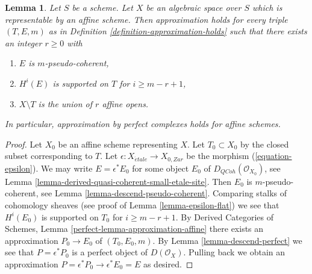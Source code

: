 \documentclass[10pt,a4paper]{amsart}
\theoremstyle{plain}
\newtheorem{lemma}[subsection]{Lemma}
\theoremstyle{definition}
\theoremstyle{remark}
\numberwithin{equation}{subsection}
\def\etale{{\acute{e}tale}}
\def\QCoh{\mathit{QCoh}}
\begin{document}
\begin{lemma}
\label{lemma-approximation-affine}
Let $S$ be a scheme. Let $X$ be an algebraic space over $S$ which is
representable by an affine scheme. Then approximation holds for every
triple $(T, E, m)$ as in Definition \ref{definition-approximation-holds}
such that there exists an integer $r \geq 0$ with
\begin{enumerate}
\item $E$ is $m$-pseudo-coherent,
\item $H^i(E)$ is supported on $T$ for $i \geq m - r + 1$,
\item $X \setminus T$ is the union of $r$ affine opens.
\end{enumerate}
In particular, approximation by perfect complexes holds for affine schemes.
\end{lemma}

\begin{proof}
Let $X_0$ be an affine scheme representing $X$. Let $T_0 \subset X_0$
by the closed subset corresponding to $T$. Let
$\epsilon : X_\etale \to X_{0, Zar}$ be the morphism
(\ref{equation-epsilon}). We may write $E = \epsilon^*E_0$ for some object
$E_0$ of $D_\QCoh(\mathcal{O}_{X_0})$, see
Lemma \ref{lemma-derived-quasi-coherent-small-etale-site}.
Then $E_0$ is $m$-pseudo-coherent, see
Lemma \ref{lemma-descend-pseudo-coherent}.
Comparing stalks of cohomology sheaves (see proof of
Lemma \ref{lemma-epsilon-flat})
we see that $H^i(E_0)$ is supported on $T_0$ for $i \geq m - r + 1$. By
Derived Categories of Schemes, Lemma \ref{perfect-lemma-approximation-affine}
there exists an approximation $P_0 \to E_0$ of
$(T_0, E_0, m)$. By Lemma \ref{lemma-descend-perfect}
we see that $P = \epsilon^*P_0$ is a perfect object of $D(\mathcal{O}_X)$.
Pulling back we obtain an approximation
$P = \epsilon^*P_0 \to \epsilon^*E_0 = E$ as desired.
\end{proof}
\end{document}
